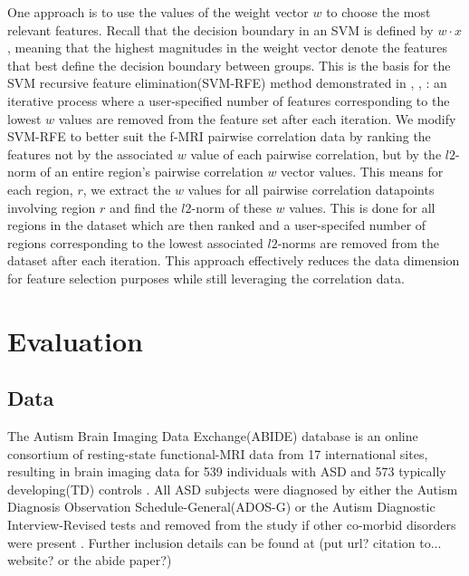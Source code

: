 \documentclass{llncs}
\begin{document}
One approach is to use the values of the weight vector $w$ to choose the most relevant features.  Recall that the decision boundary in an SVM is defined by $w \cdot x$, meaning that the highest magnitudes in the weight vector denote the features that best define the decision boundary between groups. This is the basis for the SVM recursive feature elimination(SVM-RFE) method demonstrated in \cite{guyon2002gene}, \cite{abide}, \cite{ecker2010}: an iterative process where a user-specified number of features corresponding to the lowest $w$ values are removed from the feature set after each iteration. We modify SVM-RFE to better suit the f-MRI pairwise correlation data by ranking the features not by the associated $w$ value of each pairwise correlation, but by the $l2$-norm of an entire region's pairwise correlation $w$ vector values. This means for each region, $r$, we extract the $w$ values for all pairwise correlation datapoints involving region $r$ and find the $l2$-norm of these $w$ values. This is done for all regions in the dataset which are then ranked and a user-specifed number of regions corresponding to the lowest associated $l2$-norms are removed from the dataset after each iteration.   This approach effectively reduces the data dimension for feature selection purposes while still leveraging the correlation data.

\section{Evaluation}
\subsection{Data}
The Autism Brain Imaging Data Exchange(ABIDE) database is an online consortium of resting-state functional-MRI data from 17 international sites, resulting in brain imaging data for 539 individuals with ASD and 573 typically developing(TD)  controls \cite{abide}. All ASD subjects were diagnosed by either the Autism Diagnosis Observation Schedule-General(ADOS-G) or the Autism Diagnostic Interview-Revised tests and removed from the study if other co-morbid disorders were present \cite{lordADOS} \cite{lordADIR} \cite{abide}.  Further inclusion details can be found at (put url? citation to... website? or the abide paper?)
\end{document}
